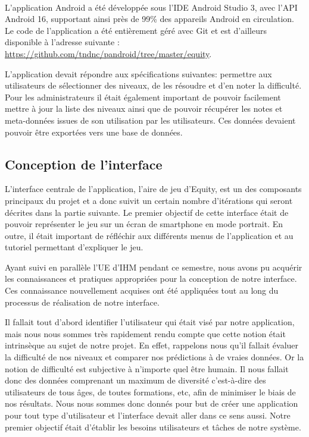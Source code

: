 \documentclass[../main.tex]{subfiles}
\begin{document}
	\paragraph{}L'application Android a été développée sous l'IDE Android Studio 3, avec l'API Android 16, supportant ainsi près de 99\% des appareils Android en circulation. Le code de l'application a été entièrement géré avec Git et est d'ailleurs disponible à l'adresse suivante : \url{https://github.com/tndnc/pandroid/tree/master/equity}. 
	
	L'application devait répondre aux spécifications suivantes: permettre aux utilisateurs de sélectionner des niveaux, de les résoudre et d'en noter la difficulté. Pour les administrateurs il était également important de pouvoir facilement mettre à jour la liste des niveaux ainsi que de pouvoir récupérer les notes et meta-données issues de son utilisation par les utilisateurs. Ces données devaient pouvoir être exportées vers une base de données.
	
	\subsection{Conception de l'interface}
	
L'interface centrale de l'application, l'aire de jeu d'Equity, est un des composants principaux du projet et a donc suivit un certain nombre d'itérations qui seront décrites dans la partie suivante. Le premier objectif de cette interface était de pouvoir représenter le jeu sur un écran de smartphone en mode portrait. En outre, il était important de réfléchir aux différents menus de l'application et au tutoriel permettant d'expliquer le jeu.

Ayant suivi en parallèle l'UE d'IHM pendant ce semestre, nous avons pu acquérir les connaissances et pratiques appropriées pour la conception de notre interface. Ces connaissance nouvellement acquises ont été appliquées tout au long du processus de réalisation de notre interface.

Il fallait tout d'abord identifier l'utilisateur qui était visé par notre application, mais nous nous sommes très rapidement rendu compte que cette notion était intrinsèque au sujet de notre projet. En effet, rappelons nous qu'il fallait évaluer la difficulté de nos niveaux et comparer nos prédictions à de vraies données. Or la notion de difficulté est subjective à n'importe quel être humain. Il nous fallait donc des données comprenant un maximum de diversité c'est-à-dire des utilisateurs de tous âges, de toutes formations, etc, afin de minimiser le biais de nos résultats. Nous nous sommes donc donnés pour but de créer une application pour tout type d'utilisateur et l'interface devait aller dans ce sens aussi. Notre premier objectif était d'établir les besoins utilisateurs et tâches de notre système.
\end{document}

